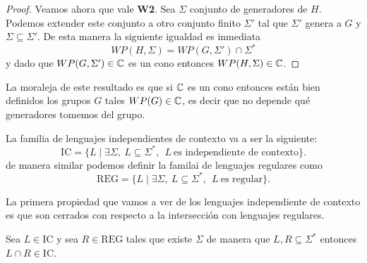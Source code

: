 \documentclass[tesis.tex]{subfiles}
\begin{document}
\begin{proof}
	Veamos ahora que vale \textbf{W2}. 
	Sea $\Sigma$ conjunto de generadores de $H$.
	Podemos extender este conjunto a otro conjunto finito $\Sigma'$ tal que $\Sigma'$ genera a $G$ y $\Sigma \subseteq \Sigma'$. 
	De esta manera la siguiente igualdad es inmediata
	\[
	WP(H, \Sigma) = WP(G, \Sigma') \cap \Sigma^*
	\]
	y dado que $WP(G, \Sigma') \in \mathbb{C}$ es un cono entonces $WP(H, \Sigma) \in \mathbb{C}$.
	
\end{proof}

La moraleja de este resultado es que si $\mathbb{C}$ es un cono entonces están bien definidos los grupos $G$ tales $WP(G) \in \mathbb{C}$, es decir que no depende qué generadores tomemos del grupo. 

La familia de lenguajes independientes de contexto va a ser la siguiente:
\[
	\text{IC} = \{  L \mid \exists \Sigma, \ L \subseteq \Sigma^*, \ \ L \  \text{es independiente de contexto} \}.
\]
de manera similar podemos definir la familai de lenguajes regulares como
\[
	\text{REG} = \{  L \mid \exists \Sigma, \ L \subseteq \Sigma^*, \ \ L \  \text{es regular}  \}.
\]

La primera propiedad que vamos a ver de los lenguajes independiente de contexto es que son cerrados con respecto a la intersección con lenguajes regulares.

\begin{prop}\label{intersecciones-reg-ic}
	Sea $L \in \text{IC}$ y sea $R \in \text{REG}$ tales que existe $\Sigma$ de manera que $L,R \subseteq \Sigma^{*}$ entonces $L \cap R \in \text{IC}$.	
\end{prop}
\end{document}
